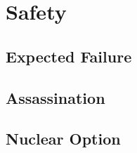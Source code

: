 \documentclass[sigplan,screen,review,anonymous,nonacm]{acmart}
\begin{document}


\section{Safety}


\subsection{Expected Failure}

\subsection{Assassination}

\subsection{Nuclear Option}
\end{document}
